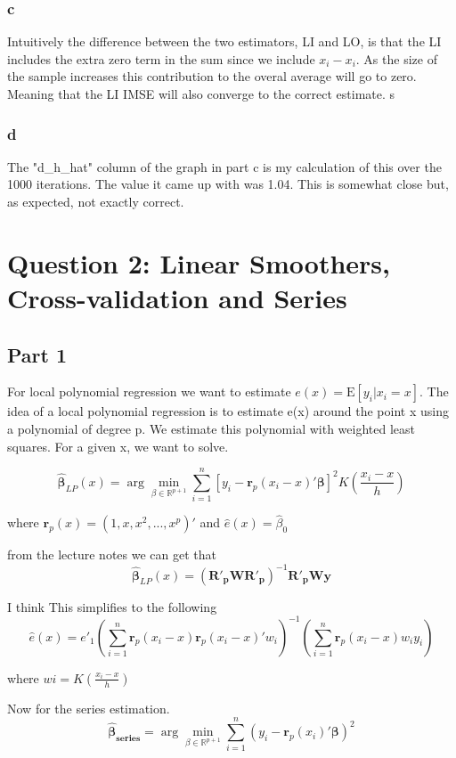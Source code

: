 \documentclass[11pt]{article}
\newcommand{\E}{\mathrm{E}}
\newcommand{\R}{\mathbb{R}}
\begin{document}
\subsubsection{c}
Intuitively the difference between the two estimators, LI and LO, is that the LI includes the extra zero term in the sum since we include $x_i - x_i$. As the size of the sample increases this contribution to the overal average will go to zero. Meaning that the LI IMSE will also converge to the correct estimate. s


\subsubsection{d}
The "d\_h\_hat" column of the graph in part c is my calculation of this over the 1000 iterations. The value it came up with was 1.04. This is somewhat close but, as expected, not exactly correct. 

\section{Question 2: Linear Smoothers, Cross-validation and Series}

\subsection{Part 1}
For local polynomial regression we want to estimate $e(x) = \E[y_i|x_i = x]$. The idea of a local polynomial regression is to estimate e(x) around the point x using a polynomial of degree p. We estimate this polynomial with weighted least squares. For a given x, we want to solve. 

$$\hat{\bm{\beta}}_{LP}(x) = \arg \min_{\beta \in \R^{p+1}} \sum_{i=1}^{n}[y_i - \bm{r}_p(x_i - x)'\bm{\beta}]^2K(\frac{x_i-x}{h})
$$

where $ \bm{r}_p(x) = (1,x,x^2,...,x^p)'$ and $\hat{e}(x) = \hat{\beta}_0$

from the lecture notes we can get that 
$$\hat{\bm{\beta}}_{LP}(x) = (\bm{R'_pWR'_p})^{-1}\bm{R'_pWy}
$$

I think This simplifies to the following 
$$\hat{e}(x)= e'_1 \left( \sum_{i=1}^{n} \bm{r}_p(x_i-x)\bm{r}_p(x_i-x)'w_i\right)^{-1} \left( \sum_{i=1}^{n} \bm{r}_p(x_i - x)w_iy_i \right)
$$

where $ wi = K(\frac{x_i - x}{h}) $

Now for the series estimation. 
$$  \bm{\hat{\beta}_{series}} = \arg \min_{\beta \in \R^{p+1}} \sum_{i=1}^{n}(y_i -\bm{r}_p(x_i)'\bm{\beta})^2
	$$
	
\end{document}
